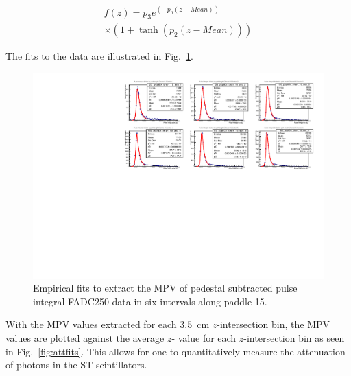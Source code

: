 	\begin{multline}\label{mul:Fit Function}
	f(z)  = p_3 e^{(-p_0(z -Mean))} \\
	       \times (1+ \tanh(p_2(z-Mean))) 
	\end{multline}   
	

The fits to the data are illustrated in Fig.~\ref{fig:pisecnosefits}. 
	\begin{figure}
		\centering
		\includegraphics[width=1.0\columnwidth]{calibration/figs/Paddle_15_fits}
		\caption{Empirical fits to extract the MPV of pedestal subtracted pulse integral FADC250 data in six intervals along paddle 15.}
		\label{fig:pisecnosefits}
	\end{figure}
With the MPV values extracted for each 3.5~cm $z$-intersection bin, the MPV values are plotted against the average $z$- value for each $z$-intersection bin as seen in Fig.~\ref{fig:attfits}.  This allows for one to quantitatively measure the attenuation of photons in the ST scintillators.


